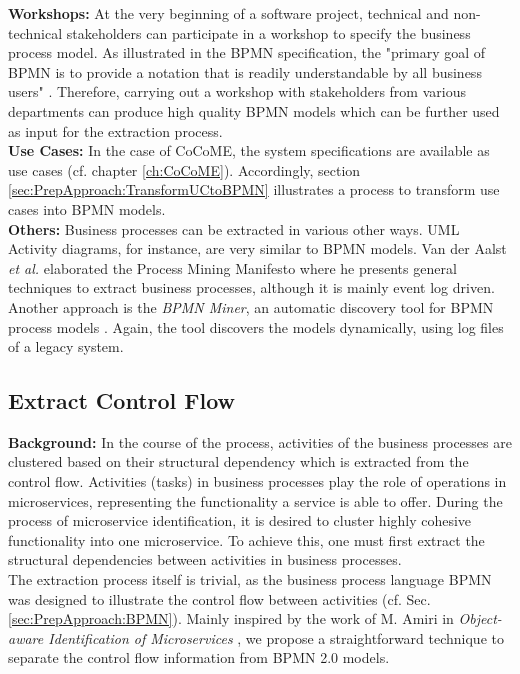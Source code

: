 \noindent
\textbf{Workshops:} At the very beginning of a software project, technical and non-technical stakeholders can participate in a workshop to specify the business process model. As illustrated in the BPMN specification, the "primary goal of BPMN is to provide a notation that is readily understandable by all business users"  \cite{OMG}. Therefore, carrying out a workshop with stakeholders from various departments can produce high quality BPMN models which can be further used as input for the extraction process.\\
\textbf{Use Cases:} In the case of CoCoME, the system specifications are available as use cases (cf. chapter \ref{ch:CoCoME}). 
Accordingly, section \ref{sec:PrepApproach:TransformUCtoBPMN} illustrates a process to transform use cases into BPMN models.  \\
\textbf{Others:} Business processes can be extracted in various other ways. UML Activity diagrams, for instance, are very similar to BPMN models. Van der Aalst \textit{et al.} elaborated the Process Mining Manifesto \cite{ProcessMiningManifesto} where he presents general techniques to extract business processes, although it is mainly event log driven. Another approach is the \textit{BPMN Miner}, an automatic discovery tool for BPMN process models \cite{BPMNMiner}. Again, the tool discovers the models dynamically, using log files of a legacy system.









\subsection{Extract Control Flow}
\label{sec:Solution:ExtractControlFlow}
\textbf{Background:} In the course of the process, activities of the business processes are clustered based on their structural dependency which is extracted from the control flow. Activities (tasks) in business processes play the role of operations in microservices, representing the functionality a service is able to offer. During the process of microservice identification, it is desired to cluster highly cohesive functionality into one microservice. To achieve this, one must first extract the structural  dependencies between activities in business processes. \\
The extraction process itself is trivial, as the business process language BPMN was designed to illustrate the control flow between activities (cf. Sec.\ref{sec:PrepApproach:BPMN}). Mainly inspired by the work of M. Amiri in \textit{Object-aware Identification of Microservices} \cite{ObjectAwareAmiri}, we propose a straightforward technique to separate the control flow information from BPMN 2.0 models.\\

